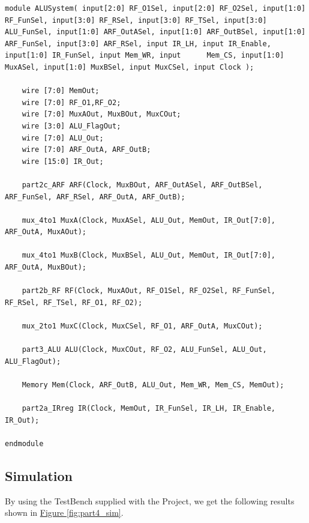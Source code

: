 \documentclass[pdftex,12pt,a4paper]{article}
\begin{document}
\begin{lstlisting}
module ALUSystem( input[2:0] RF_O1Sel, input[2:0] RF_O2Sel, input[1:0] RF_FunSel, input[3:0] RF_RSel, input[3:0] RF_TSel, input[3:0] ALU_FunSel, input[1:0] ARF_OutASel, input[1:0] ARF_OutBSel, input[1:0] ARF_FunSel, input[3:0] ARF_RSel, input IR_LH, input IR_Enable, input[1:0] IR_FunSel, input Mem_WR, input      Mem_CS, input[1:0] MuxASel, input[1:0] MuxBSel, input MuxCSel, input Clock );

    wire [7:0] MemOut;
    wire [7:0] RF_O1,RF_O2;
    wire [7:0] MuxAOut, MuxBOut, MuxCOut;
    wire [3:0] ALU_FlagOut;
    wire [7:0] ALU_Out;
    wire [7:0] ARF_OutA, ARF_OutB;
    wire [15:0] IR_Out;
    
    part2c_ARF ARF(Clock, MuxBOut, ARF_OutASel, ARF_OutBSel, ARF_FunSel, ARF_RSel, ARF_OutA, ARF_OutB);

    mux_4to1 MuxA(Clock, MuxASel, ALU_Out, MemOut, IR_Out[7:0], ARF_OutA, MuxAOut);

    mux_4to1 MuxB(Clock, MuxBSel, ALU_Out, MemOut, IR_Out[7:0], ARF_OutA, MuxBOut);

    part2b_RF RF(Clock, MuxAOut, RF_O1Sel, RF_O2Sel, RF_FunSel, RF_RSel, RF_TSel, RF_O1, RF_O2);

    mux_2to1 MuxC(Clock, MuxCSel, RF_O1, ARF_OutA, MuxCOut);

    part3_ALU ALU(Clock, MuxCOut, RF_O2, ALU_FunSel, ALU_Out, ALU_FlagOut);

    Memory Mem(Clock, ARF_OutB, ALU_Out, Mem_WR, Mem_CS, MemOut);

    part2a_IRreg IR(Clock, MemOut, IR_FunSel, IR_LH, IR_Enable, IR_Out);

endmodule
\end{lstlisting}

\subsection{Simulation}
By using the TestBench supplied with the Project, we get the following results shown in \hyperref[fig:part4_sim]{Figure \ref{fig:part4_sim}}.
\end{document}
